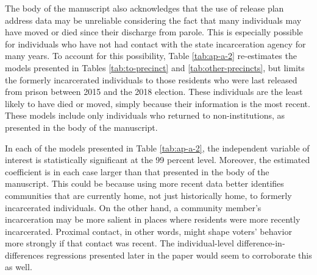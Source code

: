 \documentclass[
  12pt,
]{article}
\begin{document}
The body of the manuscript also acknowledges that the use of release plan address data may be unreliable considering the fact that many individuals may have moved or died since their discharge from parole. This is especially possible for individuals who have not had contact with the state incarceration agency for many years. To account for this possibility, Table \ref{tab:ap-a-2} re-estimates the models presented in Tables \ref{tab:to-precinct} and \ref{tab:other-precincts}, but limits the formerly incarcerated individuals to those residents who were last released from prison between 2015 and the 2018 election. These individuals are the least likely to have died or moved, simply because their information is the most recent. These models include only individuals who returned to non-institutions, as presented in the body of the manuscript.

\begin{singlespace}


\end{singlespace}

In each of the models presented in Table \ref{tab:ap-a-2}, the independent variable of interest is statistically significant at the 99 percent level. Moreover, the estimated coefficient is in each case larger than that presented in the body of the manuscript. This could be because using more recent data better identifies communities that are currently home, not just historically home, to formerly incarcerated individuals. On the other hand, a community member's incarceration may be more salient in places where residents were more recently incarcerated. Proximal contact, in other words, might shape voters' behavior more strongly if that contact was recent. The individual-level difference-in-differences regressions presented later in the paper would seem to corroborate this as well.
\end{document}
